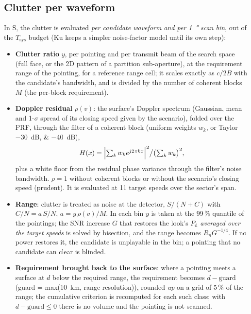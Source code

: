\documentclass[11pt,a4paper]{article}
\newcommand{\Tsys}{T_{\mathrm{sys}}}
\newcommand{\Pd}{P_{\mathrm d}}
\begin{document}
\subsection{Clutter per waveform}\label{sec:clutter}
In S, the clutter is evaluated \emph{per candidate waveform and per \SI{1}{\degree} scan bin}, out of the $\Tsys$
budget (Ku keeps a simpler noise-factor model until its own step):
\begin{itemize}
  \item \textbf{Clutter ratio} $y$, per pointing and per transmit beam of the search space (full face, or the 2D
        pattern of a partition sub-aperture), at the requirement range of the pointing, for a reference range cell;
        it scales exactly as $c/2B$ with the candidate's bandwidth, and is divided by the number of coherent blocks
        $M$ (the per-block requirement).
  \item \textbf{Doppler residual} $\rho(v)$: the surface's Doppler spectrum (Gaussian, mean and 1-$\sigma$ spread of
        its closing speed given by the scenario), folded over the PRF, through the filter of a coherent block
        (uniform weights $w_k$, or Taylor \SIlist{-30;-40}{dB}),
        \[ H(x) = \Bigl|\textstyle\sum_k w_k e^{j2\pi kx}\Bigr|^2 \big/ \bigl(\textstyle\sum_k w_k\bigr)^2, \]
        plus a white floor from the residual phase variance through the filter's noise bandwidth. $\rho = 1$ without
        coherent blocks or without the scenario's closing speed (prudent). It is evaluated at 11 target speeds over the
        sector's span.
  \item \textbf{Range}: clutter is treated as noise at the detector, $S/(N + C)$ with $C/N = a\,S/N$,
        $a = y\,\rho(v)/M$. In each bin $y$ is taken at the 99\,\% quantile of the pointings; the SNR increase $G$ that
        restores the look's $\Pd$ \emph{averaged over the target speeds} is solved by bisection, and the range becomes
        $R_n G^{-1/4}$. If no power restores it, the candidate is unplayable in the bin; a pointing that no candidate
        can clear is blinded.
  \item \textbf{Requirement brought back to the surface}: where a pointing meets a surface at $d$ below the required
        range, the requirement becomes $d - \text{guard}$ (guard = max(\SI{10}{km}, range resolution)), rounded
        \emph{up} on a grid of 5\,\% of the range; the cumulative criterion is recomputed for each such class; with
        $d - \text{guard} \le 0$ there is no volume and the pointing is not scanned.
\end{itemize}
\end{document}

